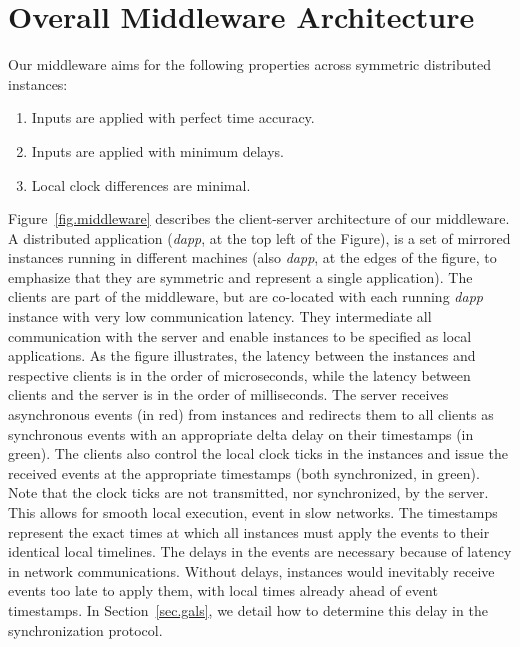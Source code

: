 \documentclass[sigplan,screen]{acmart}
\newcommand{\dapp}{\emph{dapp}\xspace}
\begin{document}
\section{Overall Middleware Architecture}
\label{sec.arch}

Our middleware aims for the following properties across symmetric distributed
instances:
%
\begin{enumerate}
\item Inputs are applied with perfect time accuracy.
\item Inputs are applied with minimum delays.
\item Local clock differences are minimal.
\end{enumerate}

Figure~\ref{fig.middleware} describes the client-server architecture of our
middleware.
A distributed application (\dapp, at the top left of the Figure), is a set of
mirrored instances running in different machines (also \dapp, at the edges of
the figure, to emphasize that they are symmetric and represent a single
application).
The clients are part of the middleware, but are co-located with each running
\dapp instance with very low communication latency.
They intermediate all communication with the server and enable instances to be
specified as local applications.
As the figure illustrates, the latency between the instances and respective
clients is in the order of microseconds, while the latency between clients and
the server is in the order of milliseconds.
The server receives asynchronous events (in red) from instances and redirects
them to all clients as synchronous events with an appropriate delta delay on
their timestamps (in green).
The clients also control the local clock ticks in the instances and issue the
received events at the appropriate timestamps (both synchronized, in green).
%
Note that the clock ticks are not transmitted, nor synchronized, by the server.
This allows for smooth local execution, event in slow networks.
%
The timestamps represent the exact times at which all instances must apply the
events to their identical local timelines.
The delays in the events are necessary because of latency in network
communications.
Without delays, instances would inevitably receive events too late to apply
them, with local times already ahead of event timestamps.
In Section~\ref{sec.gals}, we detail how to determine this delay in the
synchronization protocol.
\end{document}
